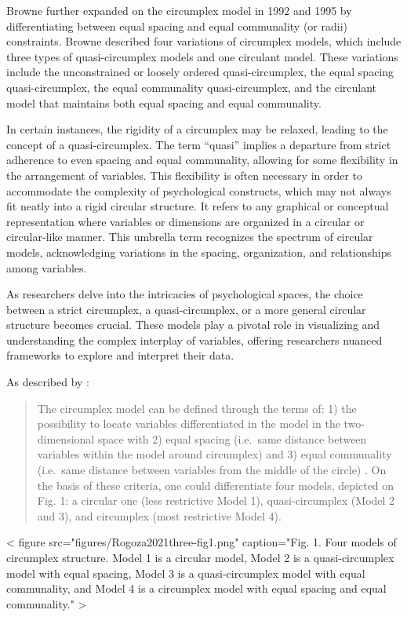 \documentclass[
  authoryear,
  preprint,
  3p]{elsarticle}
\begin{document}
Browne further expanded on the circumplex model in 1992 and 1995 by
differentiating between equal spacing and equal communality (or radii)
constraints. Browne described four variations of circumplex models,
which include three types of quasi-circumplex models and one circulant
model. These variations include the unconstrained or loosely ordered
quasi-circumplex, the equal spacing quasi-circumplex, the equal
communality quasi-circumplex, and the circulant model that maintains
both equal spacing and equal communality.

In certain instances, the rigidity of a circumplex may be relaxed,
leading to the concept of a quasi-circumplex. The term ``quasi'' implies
a departure from strict adherence to even spacing and equal communality,
allowing for some flexibility in the arrangement of variables. This
flexibility is often necessary in order to accommodate the complexity of
psychological constructs, which may not always fit neatly into a rigid
circular structure. It refers to any graphical or conceptual
representation where variables or dimensions are organized in a circular
or circular-like manner. This umbrella term recognizes the spectrum of
circular models, acknowledging variations in the spacing, organization,
and relationships among variables.

As researchers delve into the intricacies of psychological spaces, the
choice between a strict circumplex, a quasi-circumplex, or a more
general circular structure becomes crucial. These models play a pivotal
role in visualizing and understanding the complex interplay of
variables, offering researchers nuanced frameworks to explore and
interpret their data.

As described by \citet{Rogoza2021three}:

\begin{quote}
The circumplex model can be defined through the terms of: 1) the
possibility to locate variables differentiated in the model in the
two-dimensional space with 2) equal spacing (i.e.~same distance between
variables within the model around circumplex) and 3) equal communality
(i.e.~same distance between variables from the middle of the circle)
\citep[\citet{Pincus2003Interpersonal}]{Gurtman1994differentiating}. On
the basis of these criteria, one could differentiate four models,
depicted on Fig. 1: a circular one (less restrictive Model 1),
quasi-circumplex (Model 2 and 3), and circumplex (most restrictive Model
4).
\end{quote}

{{< figure src="figures/Rogoza2021three-fig1.png" caption="Fig. 1. Four models of circumplex structure. Model 1 is a circular model, Model 2 is a quasi-circumplex model with equal spacing, Model 3 is a quasi-circumplex model with equal communality, and Model 4 is a circumplex model with equal spacing and equal communality." >}}
\end{document}
